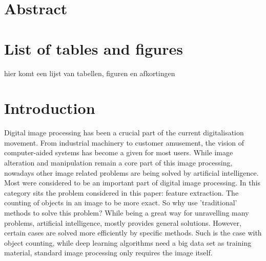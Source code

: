 \documentclass[11pt]{article}
\begin{document}


\section*{Abstract}
\thispagestyle{empty}

\newpage
\tableofcontents
\thispagestyle{empty}

\newpage
\listoftables
\thispagestyle{empty}


\tableofcontents

\section{List of tables and figures}
hier komt een lijst van tabellen, figuren en afkortingen

\newpage
\listoffigures
\thispagestyle{empty}

\newpage
\section{Introduction}

Digital image processing has been a crucial part of the current digitalisation movement. From industrial machinery to customer amusement, the vision of computer-aided systems has become a given for most users. While image alteration and manipulation remain a core part of this image processing, nowadays other image related problems are being solved by artificial intelligence. Most were considered to be an important part of digital image processing. In this category sits the problem considered in this paper: feature extraction. The counting of objects in an image to be more exact. So why use 'traditional' methods to solve this problem? While being a great way for unravelling many problems, artificial intelligence, mostly provides general solutions. However, certain cases are solved more efficiently by specific methods. Such is the case with object counting, while deep learning algorithms need a big data set as training material, standard image processing only requires the image itself.\\
\end{document}
